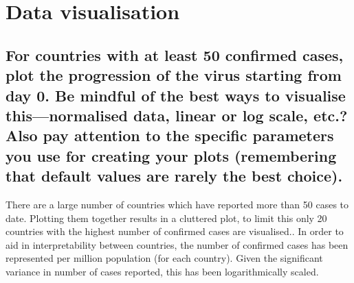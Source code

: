 \documentclass[8pt]{article}
\begin{document}
\section{Data visualisation}
\subsection{For countries with at least 50 confirmed cases, plot the progression of the virus starting from day 0. Be mindful of the best ways to visualise this—normalised data, linear or log scale, etc.? Also pay attention to the specific parameters you use for creating your plots (remembering that default values are rarely the best choice).}
There are a large number of countries which have reported more than 50 cases to date. Plotting them together results in a cluttered plot, to limit this only 20 countries with the highest number of confirmed cases are visualised.. In order to aid in interpretability between countries, the number of confirmed cases has been represented per million population (for each country). Given the significant variance in number of cases reported, this has been logarithmically scaled.
\end{document}
